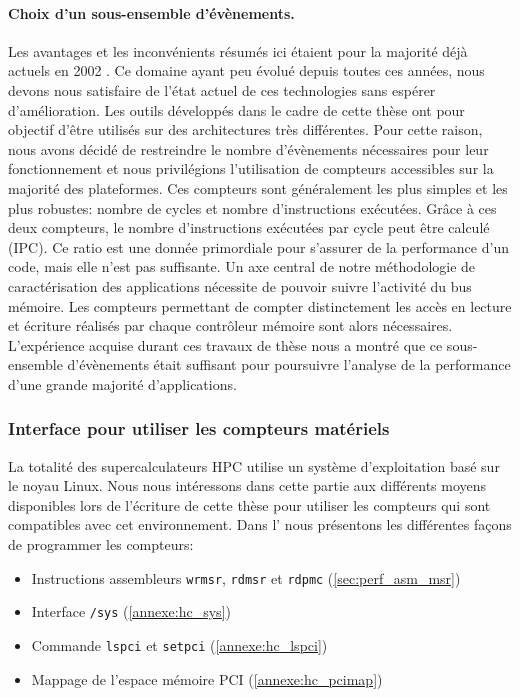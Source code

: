     

        \paragraph{Choix d'un sous-ensemble d'évènements.} 
        
            Les avantages et les inconvénients résumés ici étaient pour la majorité déjà actuels en 2002 \cite{sprunt2002basics}. Ce domaine ayant peu évolué depuis toutes ces années, nous devons nous satisfaire de l'état actuel de ces technologies sans espérer d'amélioration. Les outils développés dans le cadre de cette thèse ont pour objectif d'être utilisés sur des architectures très différentes. Pour cette raison, nous avons décidé de restreindre le nombre d'évènements nécessaires pour leur fonctionnement et nous privilégions l'utilisation de compteurs accessibles sur la majorité des plateformes. Ces compteurs sont généralement les plus simples et les plus robustes: nombre de cycles et nombre d'instructions exécutées. Grâce à ces deux compteurs, le nombre d'instructions exécutées par cycle peut être calculé (IPC). Ce ratio est une donnée primordiale pour s'assurer de la performance d'un code, mais elle n'est pas suffisante. Un axe central de notre méthodologie de caractérisation des applications nécessite de pouvoir suivre l'activité du bus mémoire. Les compteurs permettant de compter distinctement les accès en lecture et écriture réalisés par chaque contrôleur mémoire sont alors nécessaires.
            L'expérience acquise durant ces travaux de thèse nous a montré que ce sous-ensemble d'évènements était suffisant pour poursuivre l'analyse de la performance d'une grande majorité d'applications.     

    
    \subsubsection{Interface pour utiliser les compteurs matériels} \label{sec:edl_monitoring_tools}
        
        La totalité des supercalculateurs HPC utilise un système d'exploitation basé sur le noyau Linux. Nous nous intéressons dans cette partie aux différents moyens disponibles lors de l'écriture de cette thèse pour utiliser les compteurs qui sont compatibles avec cet environnement. Dans l' nous présentons les différentes façons de programmer les compteurs:
        \begin{itemize}
            \item Instructions assembleurs \verb|wrmsr|, \verb|rdmsr| et \verb|rdpmc| (\autoref{sec:perf_asm_msr})
            \item Interface \verb|/sys| (\autoref{annexe:hc_sys})
            \item Commande \verb|lspci| et \verb|setpci| (\autoref{annexe:hc_lspci})
            \item Mappage de l'espace mémoire PCI (\autoref{annexe:hc_pcimap})
        \end{itemize}
 

